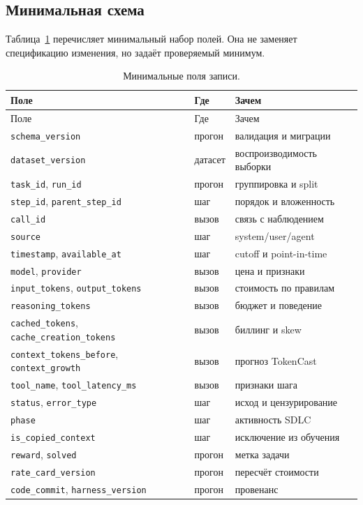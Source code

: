 \documentclass[11pt,a4paper]{article}
\begin{document}
\subsection{Минимальная схема}

Таблица~\ref{tab:fields} перечисляет минимальный набор полей. Она не
заменяет спецификацию изменения, но задаёт проверяемый минимум.

{\small
\begin{longtable}{@{}>{\raggedright\arraybackslash}p{4.0cm}>{\raggedright\arraybackslash}p{4.2cm}>{\raggedright\arraybackslash}p{6.2cm}@{}}
\caption{Минимальные поля записи.}\label{tab:fields}\\
\toprule
Поле & Где & Зачем \\
\midrule
\endfirsthead
\toprule
Поле & Где & Зачем \\
\midrule
\endhead
\bottomrule
\endfoot

\texttt{schema\_version} & прогон & валидация и миграции \\
\texttt{dataset\_version} & датасет & воспроизводимость выборки \\
\texttt{task\_id}, \texttt{run\_id} & прогон & группировка и split \\
\texttt{step\_id}, \texttt{parent\_step\_id} & шаг & порядок и вложенность \\
\texttt{call\_id} & вызов & связь с наблюдением \\
\texttt{source} & шаг & system/user/agent \\
\texttt{timestamp}, \texttt{available\_at} & шаг & cutoff и point-in-time \\
\texttt{model}, \texttt{provider} & вызов & цена и признаки \\
\texttt{input\_tokens}, \texttt{output\_tokens} & вызов & стоимость по правилам \\
\texttt{reasoning\_tokens} & вызов & бюджет и поведение \\
\texttt{cached\_tokens}, \texttt{cache\_creation\_tokens} & вызов & биллинг и skew \\
\texttt{context\_tokens\_before}, \texttt{context\_growth} & вызов & прогноз TokenCast \\
\texttt{tool\_name}, \texttt{tool\_latency\_ms} & вызов & признаки шага \\
\texttt{status}, \texttt{error\_type} & шаг & исход и цензурирование \\
\texttt{phase} & шаг & активность SDLC \\
\texttt{is\_copied\_context} & шаг & исключение из обучения \\
\texttt{reward}, \texttt{solved} & прогон & метка задачи \\
\texttt{rate\_card\_version} & прогон & пересчёт стоимости \\
\texttt{code\_commit}, \texttt{harness\_version} & прогон & провенанс \\
\end{longtable}
}
\end{document}
